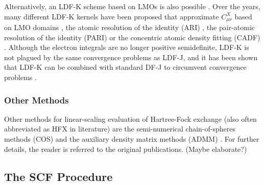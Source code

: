 \noindent Alternatively, an LDF-K scheme based on LMOs is also possible \cite{Pol2004,Mej2014}. Over the years, many different LDF-K kernels have been proposed that approximate $C_{\mu\nu}^X$ based on LMO domains \cite{Pol2004,Mej2014}, the atomic resolution of the identity (ARI) \cite{Sod2008}, the pair-atomic resolution of the identity (PARI) \cite{Mer2013} or the concentric atomic density fitting (CADF) \cite{Hol2017}. Although the electron integrals are no longer positive semidefinite, LDF-K is not plagued by the same convergence problems as LDF-J, and it has been shown that LDF-K can be combined with standard DF-J to circumvent convergence problems \cite{Man2015}. 


\subsubsection{Other Methods}

Other methods for linear-scaling evaluation of Hartree-Fock exchange (also often abbreviated as HFX in literature) are the semi-numerical chain-of-spheres methods (COS) \cite{Nee2009c,Izs2011} and the auxiliary density matrix methods (ADMM) \cite{Gui2010}. For further details, the reader is referred to the original publications. (Maybe elaborate?)


\subsection{The SCF Procedure}

